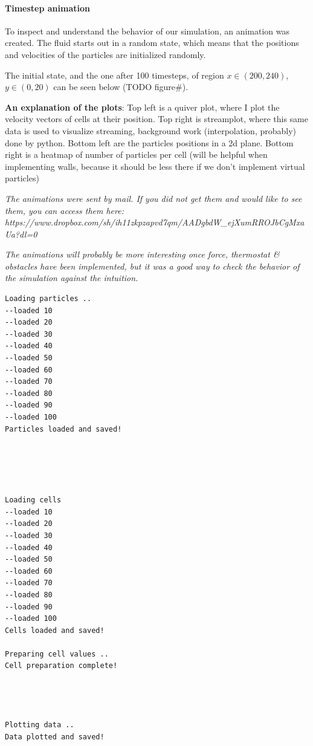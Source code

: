 \documentclass[
]{article}
\begin{document}
\hypertarget{timestep-animation}{%
\paragraph{Timestep animation}\label{timestep-animation}}

To inspect and understand the behavior of our simulation, an animation
was created. The fluid starts out in a random state, which means that
the positions and velocities of the particles are initialized randomly.

The initial state, and the one after 100 timesteps, of region
\(x \in (200, 240)\), \(y \in (0, 20)\) can be seen below (TODO
figure\#).

\textbf{An explanation of the plots}: Top left is a quiver plot, where I
plot the velocity vectors of cells at their position. Top right is
streamplot, where this same data is used to visualize streaming,
background work (interpolation, probably) done by python. Bottom left
are the particles positions in a 2d plane. Bottom right is a heatmap of
number of particles per cell (will be helpful when implementing walls,
because it should be less there if we don't implement virtual particles)

\emph{The animations were sent by mail. If you did not get them and
would like to see them, you can access them here:
https://www.dropbox.com/sh/ih11zkpzapvd7qm/AADgbdW\_ejXumRROJbCgMxaUa?dl=0}

\emph{The animations will probably be more interesting once force,
thermostat \& obstacles have been implemented, but it was a good way to
check the behavior of the simulation against the intuition.}

\begin{verbatim}
Loading particles ..
--loaded 10
--loaded 20
--loaded 30
--loaded 40
--loaded 50
--loaded 60
--loaded 70
--loaded 80
--loaded 90
--loaded 100
Particles loaded and saved!





Loading cells
--loaded 10
--loaded 20
--loaded 30
--loaded 40
--loaded 50
--loaded 60
--loaded 70
--loaded 80
--loaded 90
--loaded 100
Cells loaded and saved!

Preparing cell values ..
Cell preparation complete!




Plotting data ..
Data plotted and saved!
\end{verbatim}
\end{document}
